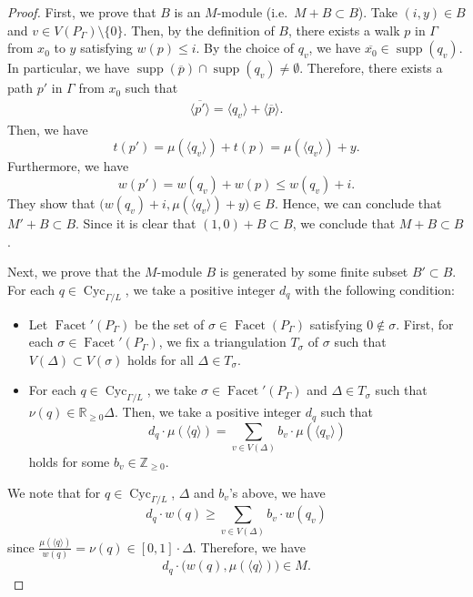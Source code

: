 \documentclass[ALCO,published]{cedram}
\theoremstyle{remark}
\begin{document}
\begin{proof}
First, we prove that $B$ is an $M$-module (i.e.\ $M + B \subset B$). 
Take $(i,y) \in B$ and $v \in V(P_{\Gamma}) \setminus \{0\}$. 
Then, by the definition of $B$, there exists a walk $p$ in $\Gamma$ from $x_0$ to $y$ satisfying $w(p) \le i$. 
By the choice of $q_v$, we have $\overline{x_0} \in \operatorname{supp}(q_v)$. 
In particular, we have 
$\operatorname{supp} (\overline{p}) \cap \operatorname{supp}(q_v) \not = \emptyset$.
Therefore, there exists a path $p'$ in $\Gamma$ from $x_0$ such that 
\begin{align*}
\langle \overline{p'} \rangle 
= \langle q_v \rangle + \langle \overline{p} \rangle. 
\end{align*}
Then, we have 
\[
t(p') 
= \mu(\langle q_v \rangle) + t(p)
= \mu(\langle q_v \rangle) + y. 
\]
Furthermore, we have 
\[
w(p') = w(q_v) + w(p) \le w(q_v) + i. 
\]
They show that $\bigl( w(q_v) + i, \mu(\langle q_v \rangle) + y \bigr) \in B$. 
Hence, we can conclude that $M' + B \subset B$. 
Since it is clear that $(1,0) + B \subset B$, we conclude that $M + B \subset B$. 

Next, we prove that the $M$-module $B$ is generated by some finite subset $B' \subset B$. 
For each $q \in \operatorname{Cyc}_{\Gamma /L}$, we take a positive integer $d_q$ with the following condition: 
\begin{itemize}
\item 
Let $\operatorname{Facet}' (P_{\Gamma})$ be the set of 
$\sigma \in \operatorname{Facet}(P_{\Gamma})$ satisfying $0 \not \in \sigma$. 
First, for each $\sigma \in \operatorname{Facet}'(P_{\Gamma})$, 
we fix a triangulation $T_{\sigma}$ of $\sigma$ such that $V(\Delta) \subset V(\sigma)$ holds for all $\Delta \in T_{\sigma}$. 

\item
For each $q \in \operatorname{Cyc}_{\Gamma /L}$, we take $\sigma \in \operatorname{Facet}'(P_{\Gamma})$ 
and $\Delta \in T_{\sigma}$ such that $\nu(q) \in \mathbb{R}_{\ge 0} \Delta$. 
Then, we take a positive integer $d_q$ such that 
\[
d_q \cdot \mu (\langle q \rangle) 
= \sum _{v \in V(\Delta)} b_v \cdot \mu (\langle q_v \rangle)
\]
holds for some $b_v \in \mathbb{Z}_{\ge 0}$. 
\end{itemize}
We note that for $q \in \operatorname{Cyc}_{\Gamma /L}$, $\Delta$ and $b_v$'s above, we have 
\[
d_q \cdot w(q) 
\ge \sum _{v \in V(\Delta)} b_v \cdot w(q_v)
\]
since $\frac{\mu(\langle q \rangle)}{w(q)} = \nu(q) \in [0,1] \cdot \Delta$. 
Therefore, we have 
\[
d_q \cdot \bigl( w(q), \mu (\langle q \rangle) \bigr) \in M. 
\]


\end{proof}
\end{document}
